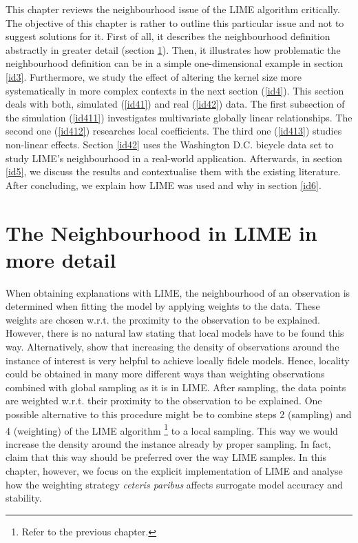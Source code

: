 \documentclass[]{krantz}
\begin{document}
This chapter reviews the neighbourhood issue of the LIME algorithm
critically. The objective of this chapter is rather to outline this
particular issue and not to suggest solutions for it. First of all, it
describes the neighbourhood definition abstractly in greater detail
(section \ref{id2}). Then, it illustrates how problematic the
neighbourhood definition can be in a simple one-dimensional example in
section \ref{id3}. Furthermore, we study the effect of altering the
kernel size more systematically in more complex contexts in the next
section (\ref{id4}). This section deals with both, simulated
(\ref{id41}) and real (\ref{id42}) data. The first subsection of the
simulation (\ref{id411}) investigates multivariate globally linear
relationships. The second one (\ref{id412}) researches local
coefficients. The third one (\ref{id413}) studies non-linear effects.
Section \ref{id42} uses the Washington D.C. bicycle data set to study
LIME's neighbourhood in a real-world application. Afterwards, in section
\ref{id5}, we discuss the results and contextualise them with the
existing literature. After concluding, we explain how LIME was used and
why in section \ref{id6}.

\section{The Neighbourhood in LIME in more detail}\label{id2}

When obtaining explanations with LIME, the neighbourhood of an
observation is determined when fitting the model by applying weights to
the data. These weights are chosen w.r.t. the proximity to the
observation to be explained. However, there is no natural law stating
that local models have to be found this way. Alternatively,
\citet{craven1996} show that increasing the density of observations
around the instance of interest is very helpful to achieve locally
fidele models. Hence, locality could be obtained in many more different
ways than weighting observations combined with global sampling as it is
in LIME. After sampling, the data points are weighted w.r.t. their
proximity to the observation to be explained. One possible alternative
to this procedure might be to combine steps 2 (sampling) and 4
(weighting) of the LIME algorithm \footnote{Refer to the previous
  chapter.} to a local sampling. This way we would increase the density
around the instance already by proper sampling. In fact,
\citet{laugel2018defining} claim that this way should be preferred over
the way LIME samples. In this chapter, however, we focus on the explicit
implementation of LIME and analyse how the weighting strategy
\emph{ceteris paribus} affects surrogate model accuracy and stability.
\end{document}

